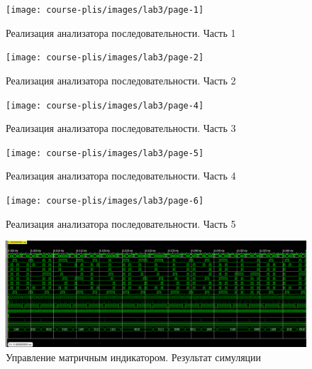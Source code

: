 
\begin{figure}[h!]
	\centering
	\texttt{[image: course-plis/images/lab3/page-1]}
	\caption{Реализация анализатора последовательности. Часть 1}
	\label{fig:3page-1}
\end{figure}
\begin{figure}[h!]
	\texttt{[image: course-plis/images/lab3/page-2]}
\caption{Реализация анализатора последовательности. Часть 2}
	\label{fig:3page-2}
\end{figure}
\begin{figure}[h!]
	\centering
	\texttt{[image: course-plis/images/lab3/page-4]}
	\caption{Реализация анализатора последовательности. Часть 3}
	\label{fig:3page-4}
\end{figure}
\begin{figure}[h!]
	\centering
	\texttt{[image: course-plis/images/lab3/page-5]}
	\caption{Реализация анализатора последовательности. Часть 4}
	\label{fig:3page-5}
\end{figure}
\begin{figure}[h!]
	\centering
	\texttt{[image: course-plis/images/lab3/page-6]}
	\caption{Реализация анализатора последовательности. Часть 5}
	\label{fig:3page-6}
\end{figure}



\begin{figure}[h!]
	\centering
	\includegraphics[width=1\linewidth]{course-plis/images/lab4/4isim}
	\caption{Управление матричным индикатором. Результат симуляции}
	\label{fig:4isim}
\end{figure}



